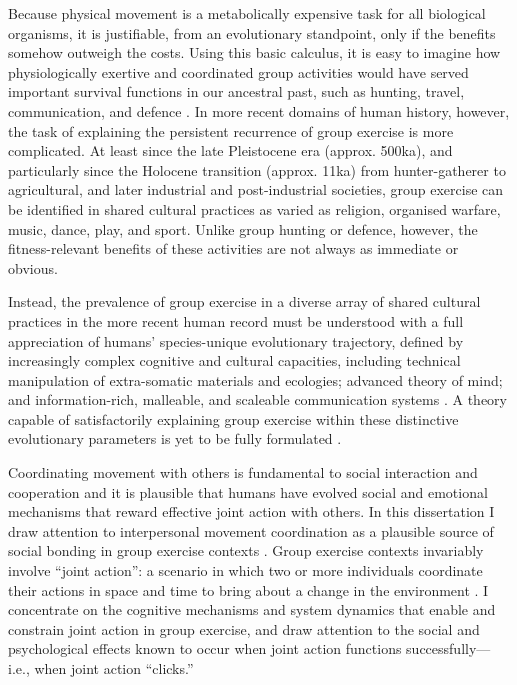 \begin{CJK}{UTF8}{gbsn}

Because physical movement is a metabolically expensive task for all biological organisms, it is justifiable, from an evolutionary standpoint, only if the benefits somehow outweigh the costs.  Using this basic calculus, it is easy to imagine how physiologically exertive and coordinated group activities would have served important survival functions in our ancestral past, such as hunting, travel, communication, and defence \citep{Sands2010}.  In more recent domains of human history, however, the task of explaining the persistent recurrence of group exercise is more complicated.  At least since the late Pleistocene era (approx. 500ka), and particularly since the Holocene transition (approx. 11ka) from hunter-gatherer to agricultural, and later industrial and post-industrial societies, group exercise can be identified in shared cultural practices as varied as religion, organised warfare, music, dance, play, and sport.  Unlike group hunting or defence, however, the fitness-relevant benefits of these activities are not always as immediate or obvious.

Instead, the prevalence of group exercise in a diverse array of shared cultural practices in the more recent human record must be understood with a full appreciation of humans' species-unique evolutionary trajectory, defined by increasingly complex cognitive and cultural capacities, including technical manipulation of extra-somatic materials and ecologies; advanced theory of mind; and information-rich, malleable, and scaleable communication systems \citep{Fuentes2016}.  A theory capable of satisfactorily explaining group exercise within these distinctive evolutionary parameters is yet to be fully formulated \citep{Cohen2017}.


Coordinating movement with others is fundamental to social interaction and cooperation and it is plausible that humans have evolved social and emotional mechanisms that reward effective joint action with others.  In this dissertation I draw attention to interpersonal movement coordination as a plausible source of social bonding in group exercise contexts \citep{Marsh2009}.  Group exercise contexts invariably involve ``joint action'': a scenario in which two or more individuals coordinate their actions in space and time to bring about a change in the environment \citep{Sebanz2006}.  I concentrate on the cognitive mechanisms and system dynamics that enable and constrain joint action in group exercise, and draw attention to the social and psychological effects known to occur when joint action functions successfully---i.e., when joint action ``clicks.''


\end{CJK}
